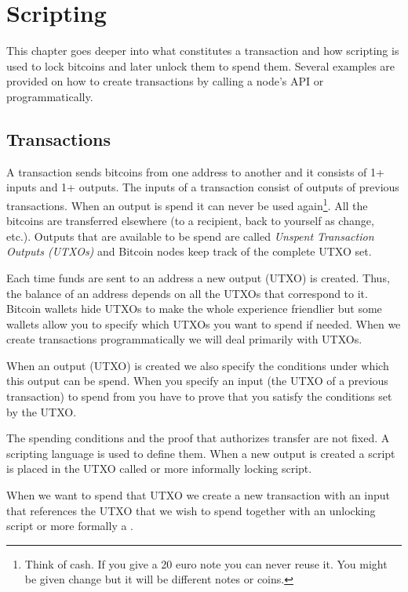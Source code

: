 \chapter{Scripting}

\begin{summary}
This chapter goes deeper into what constitutes a transaction and how scripting is used to lock bitcoins and later unlock them to spend them. Several examples are provided on how to create transactions by calling a node’s API or programmatically.
\end{summary}

\section{Transactions}

A transaction sends bitcoins from one address to another and it consists of 1+ inputs and 1+ outputs. The inputs of a transaction consist of outputs of previous transactions. When an output is spend it can never be used again\footnote{Think of cash. If you give a 20 euro note you can never reuse it. You might be given change but it will be different notes or coins.}. All the bitcoins are transferred elsewhere (to a recipient, back to yourself as change, etc.). Outputs that are available to be spend are called \emph{Unspent Transaction Outputs (UTXOs)} and Bitcoin nodes keep track of the complete UTXO set.

\begin{note}
Each time funds are sent to an address a new output (UTXO) is created. Thus, the balance of an address depends on all the UTXOs that correspond to it. Bitcoin wallets hide UTXOs to make the whole experience friendlier but some wallets allow you to specify which UTXOs you want to spend if needed. When we create transactions programmatically we will deal primarily with UTXOs.
\end{note}

When an output (UTXO) is created we also specify the conditions under which this output can be spend. When you specify an input (the UTXO of a previous transaction) to spend from you have to prove that you satisfy the conditions set by the UTXO.

The spending conditions and the proof that authorizes transfer are not fixed. A scripting language is used to define them. When a new output is created a script is placed in the UTXO called  or more informally locking script.

When we want to spend that UTXO we create a new transaction with an input that references the UTXO that we wish to spend together with an unlocking script or more formally a .

